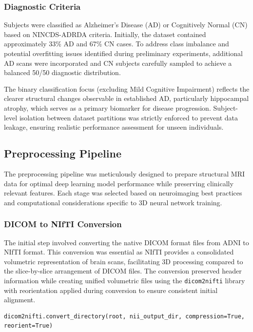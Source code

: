 \documentclass[12pt, a4paper]{article}
\begin{document}
\subsubsection{Diagnostic Criteria}

Subjects were classified as Alzheimer's Disease (AD) or Cognitively Normal (CN) based on NINCDS-ADRDA criteria. Initially, the dataset contained approximately 33\% AD and 67\% CN cases. To address class imbalance and potential overfitting issues identified during preliminary experiments, additional AD scans were incorporated and CN subjects carefully sampled to achieve a balanced 50/50 diagnostic distribution.

The binary classification focus (excluding Mild Cognitive Impairment) reflects the clearer structural changes observable in established AD, particularly hippocampal atrophy, which serves as a primary biomarker for disease progression. Subject-level isolation between dataset partitions was strictly enforced to prevent data leakage, ensuring realistic performance assessment for unseen individuals.

\subsection{Preprocessing Pipeline}

The preprocessing pipeline was meticulously designed to prepare structural MRI data for optimal deep learning model performance while preserving clinically relevant features. Each stage was selected based on neuroimaging best practices and computational considerations specific to 3D neural network training.

\subsubsection{DICOM to NIfTI Conversion}

The initial step involved converting the native DICOM format files from ADNI to NIfTI format. This conversion was essential as NIfTI provides a consolidated volumetric representation of brain scans, facilitating 3D processing compared to the slice-by-slice arrangement of DICOM files. The conversion preserved header information while creating unified volumetric files using the \texttt{dicom2nifti} library with reorientation applied during conversion to ensure consistent initial alignment.

\begin{verbatim}
dicom2nifti.convert_directory(root, nii_output_dir, compression=True, reorient=True)
\end{verbatim}
\end{document}
